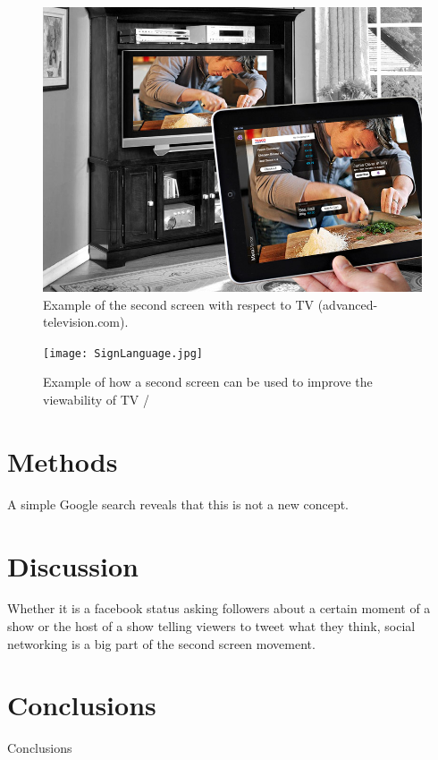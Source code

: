 \documentclass[11pt, oneside]{article}
\begin{document}
\begin{figure}[h!]
    \centering
    \includegraphics[width=.8\textwidth]{second-screen.jpg}
    \caption{Example of the second screen with respect to TV (advanced-television.com).}
    \label{second-screen}
\end{figure}

\begin{figure}[h!]
    \centering
    \texttt{[image: SignLanguage.jpg]}
    \caption{Example of how a second screen can be used to improve the viewability of TV \cite{IEEE_EFS}/}
    \label{sign-language}
\end{figure}

\section{Methods}
A simple Google search reveals that this is not a new concept.

\section{Discussion}
Whether it is a facebook status asking followers about a certain moment of a show or the host of a show telling viewers to tweet what they think, social networking is a big part of the second screen movement. 

\section{Conclusions}
Conclusions

{}

\end{document}
